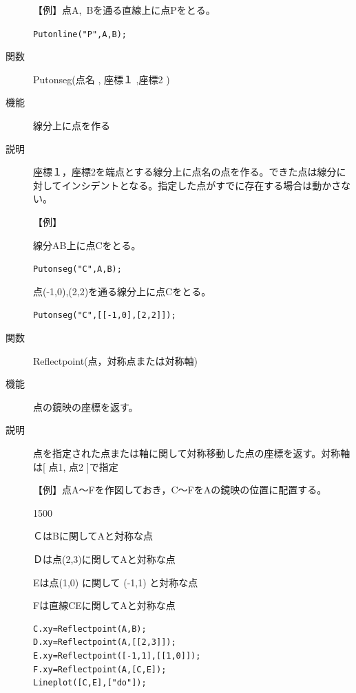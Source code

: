 \documentclass[papersize,a4paper,10pt,uplatex]{jsarticle}
\begin{document}
\begin{description}
\vspace{\baselineskip}
【例】点A,\ Bを通る直線上に点Pをとる。

\verb|Putonline("P",A,B);|

\vspace{\baselineskip}
\hypertarget{putonseg}{}
\item[関数]Putonseg(点名 , 座標１ ,座標2 )
\item[機能]線分上に点を作る
\item[説明]座標１，座標2を端点とする線分上に点名の点を作る。できた点は線分に対してインシデントとなる。指定した点がすでに存在する場合は動かさない。

\vspace{\baselineskip}
【例】

線分AB上に点Cをとる。

 \verb|Putonseg("C",A,B);|

点(-1,0),(2,2)を通る線分上に点Cをとる。

 \verb|Putonseg("C",[[-1,0],[2,2]]);|

\vspace{\baselineskip}
\hypertarget{reflectpoint}{}
\item[関数]Reflectpoint(点，対称点または対称軸)
\item[機能]点の鏡映の座標を返す。
\item[説明]点を指定された点または軸に関して対称移動した点の座標を返す。対称軸は[ 点1, 点2 ]で指定

\vspace{\baselineskip}
【例】点A〜Fを作図しておき，C〜FをAの鏡映の位置に配置する。

\begin{layer}{150}{0}
\end{layer}

\hspace{5mm} ＣはBに関してAと対称な点

\hspace{5mm} Ｄは点(2,3)に関してAと対称な点

\hspace{5mm} Eは点(1,0) に関して (-1,1) と対称な点

\hspace{5mm} Fは直線CEに関してAと対称な点

\begin{verbatim}
C.xy=Reflectpoint(A,B);
D.xy=Reflectpoint(A,[[2,3]]);
E.xy=Reflectpoint([-1,1],[[1,0]]);
F.xy=Reflectpoint(A,[C,E]);
Lineplot([C,E],["do"]);
\end{verbatim}


\end{description}
\end{document}
